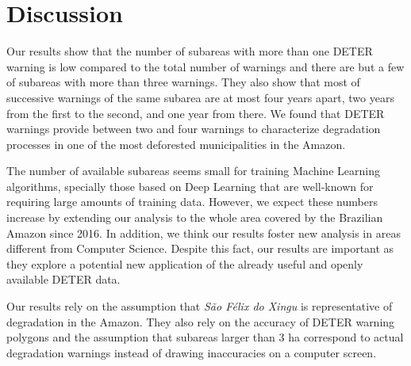 \section{Discussion}

Our results show that the number of subareas with more than one DETER warning
is low compared to the total number of warnings and there are but a few of 
subareas with more than three warnings.
They also show that most of successive warnings of the same subarea are at most 
four years apart, two years from the first to the second, and one year from 
there. 
We found that DETER warnings provide between two and four warnings to 
characterize degradation processes in one of the most deforested municipalities 
in the Amazon. 

The number of available subareas seems small for training Machine Learning 
algorithms, specially those based on Deep Learning that are well-known
for requiring large amounts of training data.
However, we expect these numbers increase by extending our analysis to the 
whole area covered by the Brazilian Amazon since 2016.
In addition, we think our results foster new analysis in areas different from 
Computer Science.
Despite this fact, our results are important as they explore a potential new
application of the already useful and openly available DETER data.

Our results rely on the assumption that \textit{São Félix do Xingu} is 
representative of degradation in the Amazon.
They also rely on the accuracy of DETER warning polygons and the assumption
that subareas larger than 3 ha correspond to actual degradation warnings 
instead of drawing inaccuracies on a computer screen.

